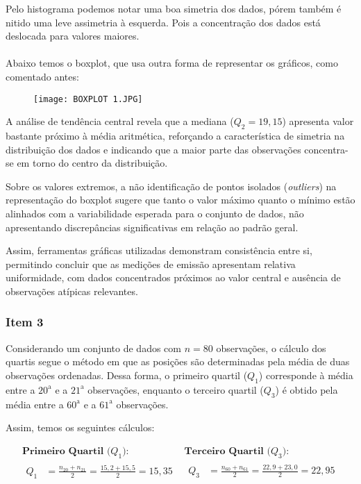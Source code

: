 \documentclass[a4paper,11pt]{article}
\begin{document}
Pelo histograma podemos notar uma boa simetria dos dados, pórem também é nitido uma leve assimetria à esquerda. Pois a concentração dos dados está deslocada para valores maiores.
\\
\\
Abaixo temos o boxplot, que usa outra forma de representar os gráficos, como comentado antes:
\newpage
\begin{figure}[h]
    \centering
    \texttt{[image: BOXPLOT 1.JPG]}
    \caption{}
    \label{fig:placeholder}
\end{figure}

A análise de tendência central revela que a mediana (\(Q_2 = 19,15\)) apresenta valor bastante próximo à média aritmética, reforçando a característica de simetria na distribuição dos dados e indicando que a maior parte das observações concentra-se em torno do centro da distribuição.

Sobre os valores extremos, a não identificação de pontos isolados (\textit{outliers}) na representação do boxplot sugere que tanto o valor máximo quanto o mínimo estão alinhados com a variabilidade esperada para o conjunto de dados, não apresentando discrepâncias significativas em relação ao padrão geral.

Assim, ferramentas gráficas utilizadas demonstram consistência entre si, permitindo concluir que as medições de emissão apresentam relativa uniformidade, com dados concentrados próximos ao valor central e ausência de observações atípicas relevantes.
\\

\subsubsection{Item 3}
Considerando um conjunto de dados com $n=80$ observações, o cálculo dos quartis segue o método em que as posições são determinadas pela média de duas observações ordenadas. Dessa forma, o primeiro quartil ($Q_1$) corresponde à média entre a $20^{\text{a}}$ e a $21^{\text{a}}$ observações, enquanto o terceiro quartil ($Q_3$) é obtido pela média entre a $60^{\text{a}}$ e a $61^{\text{a}}$ observações.

Assim, temos os seguintes cálculos:

\[
\begin{array}{ll}
\textbf{Primeiro Quartil ($Q_1$):} & \textbf{Terceiro Quartil ($Q_3$):} \\
\begin{aligned}
Q_1 &= \frac{n_{20} + n_{21}}{2} = \frac{15{,}2 + 15{,}5}{2} = 15{,}35
\end{aligned}
&
\begin{aligned}
Q_3 &= \frac{n_{60} + n_{61}}{2} = \frac{22{,}9 + 23{,}0}{2} = 22{,}95
\end{aligned}
\end{array}
\]
\end{document}

